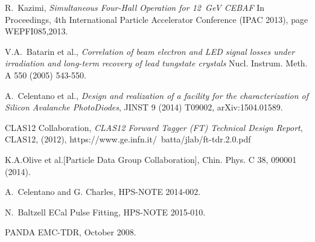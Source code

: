 \documentclass[12pt]{report}
\begin{document}
\begin{thebibliography}{99}
 R.~Kazimi, {\it Simultaneous Four-Hall Operation for 12~GeV CEBAF} In Proceedings, 4th International Particle Accelerator Conference (IPAC 2013), page WEPFI085,2013.

 V.A.~Batarin et al., {\it Correlation of beam electron and LED signal losses under irradiation and long-term recovery of lead tungstate crystals} Nucl. Instrum. Meth. A 550 (2005) 543-550.

 A.~Celentano et al., {\it Design and realization of a facility for the characterization of Silicon Avalanche PhotoDiodes}, JINST 9 (2014) T09002, arXiv:1504.01589.

 CLAS12 Collaboration, {\it CLAS12 Forward Tagger (FT) Technical Design Report}, CLAS12, (2012), https://www.ge.infn.it/~batta/jlab/ft-tdr.2.0.pdf

 K.A.Olive et al.[Particle Data Group Collaboration], Chin. Phys. C 38, 090001 (2014).

 A.~Celentano and G. Charles, HPS-NOTE 2014-002.

 N.~Baltzell ECal Pulse Fitting, HPS-NOTE 2015-010.

 PANDA EMC-TDR, October 2008.


\end{thebibliography}


\appendix


\achapter{}



\newpage


\vitapage
\end{document}
